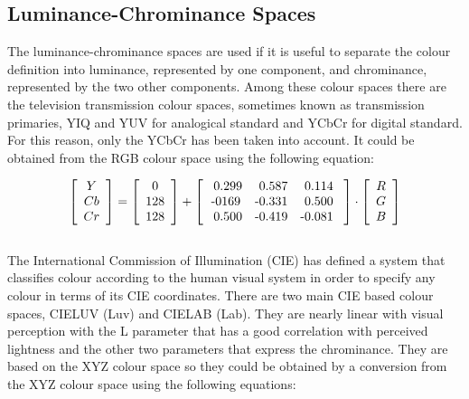 \documentclass[final,a4paper,12pt,english]{UnicaPhdThesis3}
\begin{document}
\subsection{Luminance-Chrominance Spaces}  %
The luminance-chrominance spaces are used if it is useful to separate the colour definition into luminance, represented by one component, and chrominance, represented by the two other components. Among these colour spaces there are the television transmission colour spaces, sometimes known as transmission primaries, YIQ and YUV for analogical standard and YCbCr for digital standard. For this reason, only the YCbCr has been taken into account. It could be obtained from the RGB colour space using the following equation:

\begin{equation}\label{Ycbcr}
\left [ {  \begin{array}{c} Y  \\ Cb   \\ Cr \end{array} } \right ] = \left [{ \begin{array}{c} 0  \\ 128   \\ 128  \end{array} } \right ] +
\left [ { \begin{array}{c c c} \mbox{ 0.299}  & \mbox{ 0.587} & \mbox{ 0.114 } \\ \mbox{-0169} & \mbox{-0.331} & \mbox{ 0.500 } \\ \mbox{ 0.500} & \mbox{-0.419} & \mbox{-0.081 }  \end{array} } \right ] \cdot \left [ { \begin{array}{c} R  \\ G  \\ B  \end{array} } \right ] 
\end{equation}
\\
The International Commission of Illumination (CIE) has defined a system that classifies colour according to the human visual system in order to specify any colour in terms of its CIE coordinates. There are two main CIE based colour spaces, CIELUV (Luv) and CIELAB (Lab). They are nearly linear with visual perception with the L parameter that has a good correlation with perceived lightness and the other two parameters that express the chrominance. They are based on the XYZ colour space so they could be obtained by a conversion from the XYZ colour space using the following equations:
\end{document}
